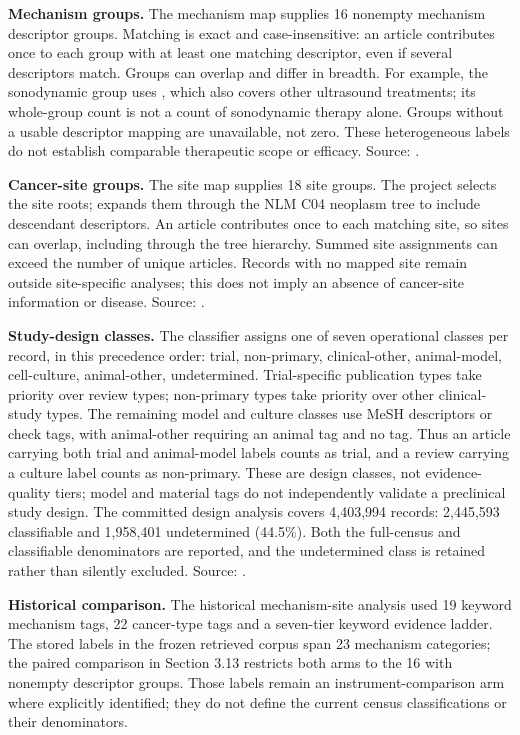 \documentclass[11pt,twoside,openright]{report}
\begin{document}
\textbf{Mechanism groups.} The mechanism map supplies 16 nonempty mechanism descriptor groups. Matching is exact and case-insensitive: an article contributes once to each group with at least one matching descriptor, even if several descriptors match. Groups can overlap and differ in breadth. For example, the sonodynamic group uses , which also covers other ultrasound treatments; its whole-group count is not a count of sonodynamic therapy alone. Groups without a usable descriptor mapping are unavailable, not zero. These heterogeneous labels do not establish comparable therapeutic scope or efficacy. Source: .

\textbf{Cancer-site groups.} The site map supplies 18 site groups. The project selects the site roots;  expands them through the NLM C04 neoplasm tree to include descendant descriptors. An article contributes once to each matching site, so sites can overlap, including through the tree hierarchy. Summed site assignments can exceed the number of unique articles. Records with no mapped site remain outside site-specific analyses; this does not imply an absence of cancer-site information or disease. Source: .

\textbf{Study-design classes.} The classifier assigns one of seven operational classes per record, in this precedence order: trial, non-primary, clinical-other, animal-model, cell-culture, animal-other, undetermined. Trial-specific publication types take priority over review types; non-primary types take priority over other clinical-study types. The remaining model and culture classes use MeSH descriptors or check tags, with animal-other requiring an animal tag and no  tag. Thus an article carrying both trial and animal-model labels counts as trial, and a review carrying a culture label counts as non-primary. These are design classes, not evidence-quality tiers; model and material tags do not independently validate a preclinical study design. The committed design analysis covers 4,403,994 records: 2,445,593 classifiable and 1,958,401 undetermined (44.5\%). Both the full-census and classifiable denominators are reported, and the undetermined class is retained rather than silently excluded. Source: .

\textbf{Historical comparison.} The historical mechanism-site analysis used 19 keyword mechanism tags, 22 cancer-type tags and a seven-tier keyword evidence ladder. The stored labels in the frozen retrieved corpus span 23 mechanism categories; the paired comparison in Section 3.13 restricts both arms to the 16 with nonempty descriptor groups. Those labels remain an instrument-comparison arm where explicitly identified; they do not define the current census classifications or their denominators.
\end{document}
